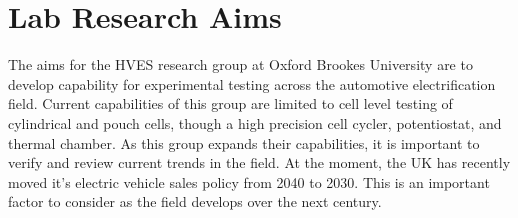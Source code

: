 \documentclass[12pt,a4paper,oneside]{memoir}
\begin{document}
\section*{Lab Research Aims}


{The aims for the HVES research group at Oxford Brookes University are to develop capability for experimental testing across the automotive electrification field. Current capabilities of this group are limited to cell level testing of cylindrical and pouch cells, though a high precision cell cycler, potentiostat, and thermal chamber. As this group expands their capabilities, it is important to verify and review current trends in the field. At the moment, the UK has recently moved it's electric vehicle sales policy from 2040 to 2030. This is an important factor to consider as the field develops over the next century.\\}


\begin{table}[H]
  \centering
  \captionsetup{aboveskip=0pt,font=it}
  \caption{Pack Tester Required Specification}
    \end{table}


    





\end{document}
